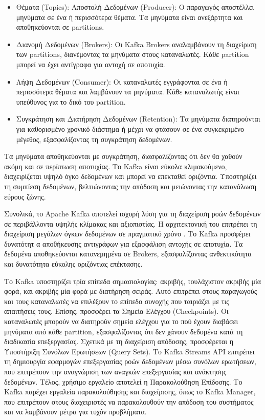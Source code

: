 \begin{itemize}
\item Θέματα (Topics): Αποστολή Δεδομένων (Producer): Ο παραγωγός αποστέλλει μηνύματα σε ένα ή περισσότερα θέματα. Τα μηνύματα είναι ανεξάρτητα και αποθηκεύονται σε partitions.
\item Διανομή Δεδομένων (Brokers): Οι Kafka Brokers αναλαμβάνουν τη διαχείριση των partitions, διανέμοντας τα μηνύματα στους καταναλωτές. Κάθε partition μπορεί να έχει αντίγραφα για αντοχή σε αποτυχία.
\item Λήψη Δεδομένων (Consumer): Οι καταναλωτές εγγράφονται σε ένα ή περισσότερα θέματα και λαμβάνουν τα μηνύματα. Κάθε καταναλωτής είναι υπεύθυνος για το δικό του partition.
\item Συγκράτηση και Διατήρηση Δεδομένων (Retention): Τα μηνύματα διατηρούνται για καθορισμένο χρονικό διάστημα ή μέχρι να φτάσουν σε ένα συγκεκριμένο μέγεθος, εξασφαλίζοντας τη συγκράτηση δεδομένων.
\end{itemize}

Τα μηνύματα αποθηκεύονται με συγκράτηση, διασφαλίζοντας ότι δεν θα χαθούν ακόμη και σε περίπτωση αποτυχίας. Το Kafka είναι εύκολα κλιμακούμενο, διαχειρίζεται υψηλό όγκο δεδομένων και μπορεί να επεκταθεί οριζόντια. Υποστηρίζει τη συμπίεση δεδομένων, βελτιώνοντας την απόδοση και μειώνοντας την κατανάλωση εύρους ζώνης.

Συνολικά, το Apache Kafka αποτελεί ισχυρή λύση για τη διαχείριση ροών δεδομένων σε περιβάλλοντα υψηλής κλίμακας και αξιοπιστίας. Η αρχιτεκτονική του επιτρέπει τη διαχείριση μεγάλων όγκων δεδομένων σε πραγματικό χρόνο \cite{kafka2}. Το Kafka προσφέρει δυνατότητ\vfill
α αποθήκευσης αντιγράφων για εξασφάλιση αντοχής σε αποτυχία. Τα δεδομένα αποθηκεύονται κατανεμημένα σε Brokers, εξασφαλίζοντας ανθεκτικότητα και δυνατότητα εύκολης οριζόντιας επέκτασης.

Το Kafka υποστηρίζει τρία επίπεδα σημασιολογίας: ακριβής, τουλάχιστον ακριβής μία φορά, και ακριβής μία φορά με διατήρηση σειράς. Αυτό επιτρέπει στους παραγωγούς και τους καταναλωτές να επιλέξουν το επίπεδο συνοχής που ταιριάζει με τις απαιτήσεις τους. Επίσης, προσφέρει τα Σημεία Ελέγχου (Checkpoints). Οι καταναλωτές μπορούν να διατηρούν σημεία ελέγχου για το πού έχουν διαβάσει μηνύματα από κάθε partition, εξασφαλίζοντας ότι δεν χάνουν δεδομένα κατά τη διαδικασία επεξεργασίας. Σχετικά με τη διαχείριση απόδοσης, προσφέρεται η Υποστήριξη Συνόλων Ερωτήσεων (Query Sets). Το Kafka Streams API επιτρέπει τη δημιουργία εφαρμογών επεξεργασίας ροών δεδομένων μέσω συνόλων ερωτήσεων, που επιτρέπουν την αναγνώριση των αναγκών επεξεργασίας και ανάκτησης δεδομένων. Τέλος, χρήσιμο εργαλείο αποτελεί η Παρακολούθηση Επίδοσης. Το Kafka παρέχει εργαλεία παρακολούθησης και διαχείρισης, όπως το Kafka Manager, που επιτρέπουν στους διαχειριστές να παρακολουθούν την απόδοση του συστήματος και να λαμβάνουν μέτρα για τυχόν προβλήματα.

